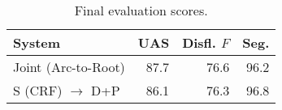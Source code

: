 \documentclass[11pt,letterpaper]{article}
\begin{document}
\begin{table}
    \centering
    \small
    \begin{tabular}{l|rrr}
        System & UAS & Disfl. $F$ & Seg. \\
        \hline \hline
        Joint (Arc-to-Root) & 87.7 & 76.6 & 96.2 \\
        S (CRF) $\rightarrow$ D+P & 86.1 & 76.3 & 96.8 \\
        \hline
    \end{tabular}
    \caption{\small Final evaluation scores.}
    \vspace*{-4em}
\end{table}





\end{document}

